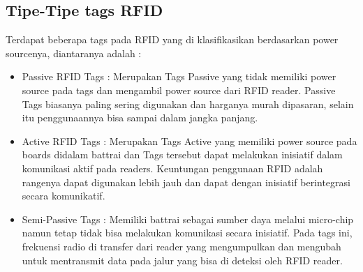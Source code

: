\subsection{Tipe-Tipe tags RFID}
Terdapat beberapa tags pada RFID yang di klasifikasikan berdasarkan power sourcenya, diantaranya adalah : 
\begin{itemize}
\item Passive RFID Tags : Merupakan Tags Passive yang tidak memiliki power source pada tags dan mengambil power source dari RFID reader. Passive Tags biasanya paling sering digunakan dan harganya murah dipasaran, selain itu penggunaannya bisa sampai dalam jangka panjang.
\item Active RFID Tags : Merupakan Tags Active yang memiliki power source pada boards didalam battrai dan Tags tersebut dapat melakukan inisiatif dalam komunikasi aktif pada readers. Keuntungan penggunaan RFID adalah rangenya dapat digunakan lebih jauh dan dapat dengan inisiatif berintegrasi secara komunikatif.
\item Semi-Passive Tags : Memiliki battrai sebagai sumber daya melalui micro-chip namun tetap tidak bisa melakukan komunikasi secara inisiatif. Pada tags ini, frekuensi radio di transfer dari reader yang mengumpulkan dan mengubah untuk mentransmit data pada jalur yang bisa di deteksi oleh RFID reader. 
\end{itemize}